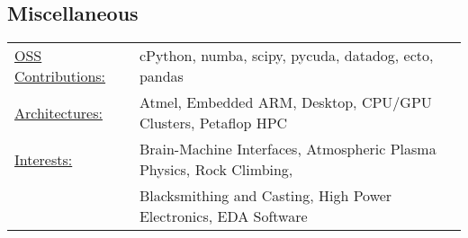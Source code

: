 \documentclass{res}
\begin{document}
\begin{resume}
\section{Miscellaneous}
  \begin{tabular}{l p{5.5in}}
    \underline{OSS Contributions:} & cPython, numba, scipy, pycuda, datadog, ecto, pandas  \\
    \underline{Architectures:}     & Atmel, Embedded ARM, Desktop, CPU/GPU Clusters, Petaflop HPC \\
    \underline{Interests:}         & Brain-Machine Interfaces, Atmospheric Plasma Physics, Rock Climbing, \\
                                   & Blacksmithing and Casting, High Power Electronics, EDA Software
 \end{tabular}

\end{resume}
\end{document}
